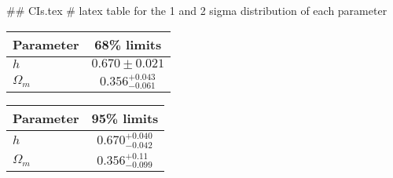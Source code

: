 ## CIs.tex
# latex table for the 1 and 2 sigma distribution of each parameter

\begin{tabular} { l  c}
 Parameter &  68\% limits\\
\hline
{\boldmath$h              $} & $0.670\pm 0.021            $\\
{\boldmath$\Omega_m       $} & $0.356^{+0.043}_{-0.061}   $\\
\hline
\end{tabular}

\begin{tabular} { l  c}
 Parameter &  95\% limits\\
\hline
{\boldmath$h              $} & $0.670^{+0.040}_{-0.042}   $\\
{\boldmath$\Omega_m       $} & $0.356^{+0.11}_{-0.099}    $\\
\hline
\end{tabular}
